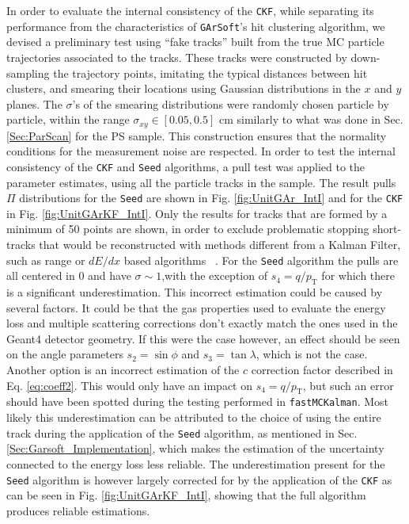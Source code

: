 In order to evaluate the internal consistency of the \texttt{CKF}, while separating its performance from the characteristics of \texttt{GArSoft}'s hit clustering algorithm, we devised a preliminary test using \enquote{fake tracks} built from the true MC particle trajectories associated to the tracks. These tracks were constructed by down-sampling the trajectory points, imitating the typical distances between hit clusters, and smearing their locations using Gaussian  distributions in the $x$ and $y$ planes. The $\sigma$'s of the smearing distributions were randomly chosen particle by particle, within the range $\sigma_{xy}\in [0.05,0.5]$ cm similarly to what was done in Sec. \ref{Sec:ParScan} for the PS sample. This construction ensures that the normality conditions for the measurement noise are respected. In order to test the internal consistency of the \texttt{CKF} and \texttt{Seed} algorithms, a pull test was applied to the parameter estimates, using all the particle tracks in the sample. The result pulls $\Pi$ distributions for the \texttt{Seed} are shown in Fig. \ref{fig:UnitGAr_IntI} and for the \texttt{CKF} in Fig. \ref{fig:UnitGArKF_IntI}. Only the results for tracks that are formed by a minimum of 50 points are shown, in order to exclude problematic stopping short-tracks that would be reconstructed with methods different from a Kalman Filter, such as range or $dE/dx$ based algorithms ~\cite{RevModPhys.82.1419}. For the \texttt{Seed} algorithm the pulls are all centered in 0 and have $\sigma\sim 1$,with the exception of $s_4=q/p_\textrm{T}$ for which there is a significant underestimation. This incorrect estimation could be caused by several factors. It could be that the gas properties used to evaluate the energy loss and multiple scattering corrections don't exactly match the ones used in the Geant4 detector geometry. If this were the case however, an effect should be seen on the angle parameters $s_2=\sin\phi$ and $s_3=\tan\lambda$, which is not the case. Another option is an incorrect estimation of the $c$ correction factor described in Eq. \ref{eq:coeff2}. This would only have an impact on $s_4=q/p_\textrm{T}$, but such an error should have been spotted during the testing performed in \texttt{fastMCKalman}. Most likely this underestimation can be attributed to the choice of using the entire track during the application of the \texttt{Seed} algorithm, as mentioned in Sec. \ref{Sec:Garsoft_Implementation}, which makes the estimation of the uncertainty connected to the energy loss less reliable. The underestimation present for the \texttt{Seed} algorithm is however largely corrected for by the application of the \texttt{CKF} as can be seen in Fig. \ref{fig:UnitGArKF_IntI}, showing that the full algorithm produces reliable estimations.

